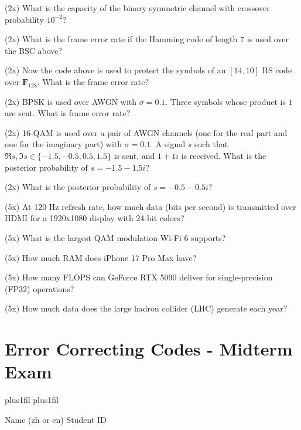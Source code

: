 \documentclass[a4paper]{article}
\def\FF{\mathbf F}
\begin{document}
\Problem{3em} (2x)
What is the capacity of the binary symmetric channel
with crossover probability $10^{-2}$?

\Problem{3em} (2x)
What is the frame error rate if the Hamming code
of length $7$ is used over the BSC above?

\Problem{3em} (2x)
Now the code above is used to protect the symbols
of an $[14, 10]$ RS code over $\FF_{128}$.
What is the frame error rate?

\Problem{3em} (2x)
BPSK is used over AWGN with $\sigma = 0.1$.
Three symbols whose product is $1$ are sent.
What is frame error rate?

\Problem{3em} (2x)
16-QAM is used over a pair of AWGN channels
(one for the real part and one for the imaginary part) with $\sigma = 0.1$.
A signal $s$ such that $\Re s, \Im s \in \{-1.5, -0.5, 0.5, 1.5\}$ is sent,
and $1 + 1i$ is received.
What is the posterior probability of $s = -1.5 - 1.5i$?

\Problem{3em} (2x)
What is the posterior probability of $s = -0.5 -0.5i$?


\Problem{3em} (5x)
At 120 Hz refresh rate, how much data (bits per second)
is transmitted over HDMI for a 1920x1080 display with 24-bit colors?

\Problem{3em} (5x)
What is the largest QAM modulation Wi-Fi 6 supports?

\Problem{3em} (5x)
How much RAM does iPhone 17 Pro Max have?

\Problem{3em} (5x)
How many FLOPS can GeForce RTX 5090 deliver
for single-precision (FP32) operations?

\Problem{3em} (5x)
How much data does the large hadron collider (LHC) generate each year?

\cleardoublepage

\section*{Error Correcting Codes - Midterm Exam}

\parskip0pt
\advance{} plus1fil
\advance\baselineskip1cm plus1fil

Name (zh or en) \hfil Student ID

\answersheet
\end{document}
